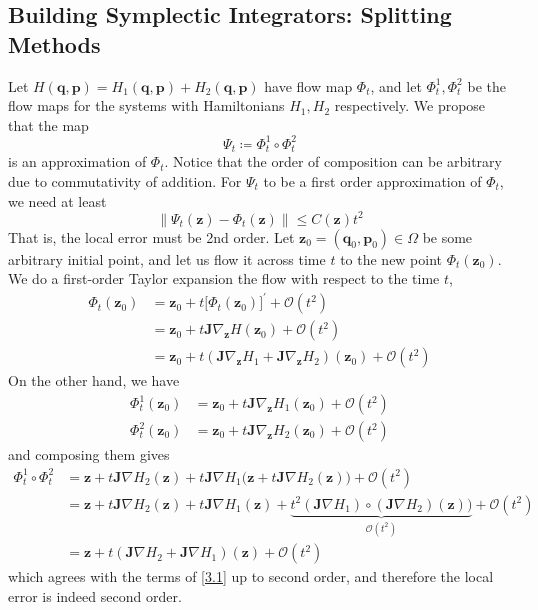   \subsection{Building Symplectic Integrators: Splitting Methods}

    Let $H(\mathbf{q}, \mathbf{p}) = H_1 (\mathbf{q}, \mathbf{p}) + H_2 (\mathbf{q}, \mathbf{p})$ have flow map $\Phi_t$, and let $\Phi_t^1, \Phi_t^2$ be the flow maps for the systems with Hamiltonians $H_1, H_2$ respectively. We propose that the map 
    \begin{equation}
      \Psi_t \coloneqq \Phi_t^1 \circ \Phi_t^2
    \end{equation}
    is an approximation of $\Phi_t$. Notice that the order of composition can be arbitrary due to commutativity of addition. For $\Psi_t$ to be a first order approximation of $\Phi_t$, we need at least 
    \begin{equation}
      \|\Psi_t (\mathbf{z}) - \Phi_t (\mathbf{z}) \| \leq C(\mathbf{z}) t^2
    \end{equation}
    That is, the local error must be 2nd order. Let $\mathbf{z}_0 = (\mathbf{q}_0, \mathbf{p}_0) \in \Omega$ be some arbitrary initial point, and let us flow it across time $t$ to the new point $\Phi_t (\mathbf{z}_0)$. We do a first-order Taylor expansion the flow with respect to the time $t$, 
    \begin{align*}
      \Phi_t (\mathbf{z}_0) & = \mathbf{z}_0 + t \big[\Phi_t (\mathbf{z}_0)\big]^\prime + \mathcal{O}(t^2) \\
      & = \mathbf{z}_0 + t \mathbf{J} \nabla_\mathbf{z} H(\mathbf{z}_0) + \mathcal{O}(t^2) \\
      & = \mathbf{z}_0 + t (\mathbf{J} \nabla_\mathbf{z} H_1 + \mathbf{J} \nabla_\mathbf{z} H_2) (\mathbf{z}_0) + \mathcal{O}(t^2) \tag{3.1} \label{3.1}
    \end{align*}
    On the other hand, we have
    \begin{align*}
      \Phi_t^1 (\mathbf{z}_0) & = \mathbf{z}_0 + t \mathbf{J} \nabla_\mathbf{z} H_1 (\mathbf{z}_0) + \mathcal{O}(t^2) \\
      \Phi_t^2 (\mathbf{z}_0) & = \mathbf{z}_0 + t \mathbf{J} \nabla_\mathbf{z} H_2 (\mathbf{z}_0) + \mathcal{O}(t^2) 
    \end{align*}
    and composing them gives 
    \begin{align*}
      \Phi_t^1 \circ \Phi_t^2 & = \mathbf{z} + t \mathbf{J} \nabla H_2 (\mathbf{z}) + t\mathbf{J} \nabla H_1 \big( \mathbf{z} + t \mathbf{J} \nabla H_2 (\mathbf{z}) \big) + \mathcal{O}(t^2) \\
      & = \mathbf{z} + t \mathbf{J} \nabla H_2 (\mathbf{z}) + t \mathbf{J} \nabla H_1 (\mathbf{z}) + \underbrace{t^2 (\mathbf{J} \nabla H_1) \circ (\mathbf{J} \nabla H_2)  (\mathbf{z})\big)}_{\mathcal{O}(t^2)} + \mathcal{O}(t^2) \\
      & = \mathbf{z} + t (\mathbf{J} \nabla H_2 + \mathbf{J} \nabla H_1) (\mathbf{z}) + \mathcal{O}(t^2)
    \end{align*}
    which agrees with the terms of \eqref{3.1} up to second order, and therefore the local error is indeed second order. 

